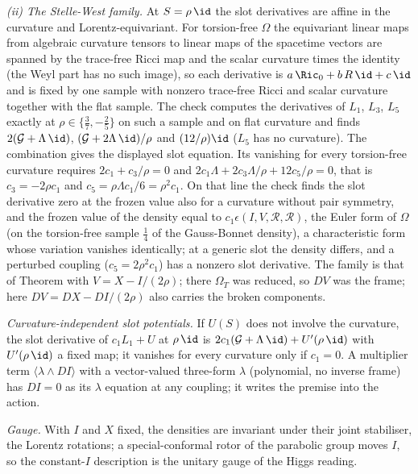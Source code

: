 \emph{(ii) The Stelle-West family.} At $S = \rho\,\id$ the slot derivatives are affine in the curvature and Lorentz-equivariant. For torsion-free $\Omega$ the equivariant linear maps from algebraic curvature tensors to linear maps of the spacetime vectors are spanned by the trace-free Ricci map and the scalar curvature times the identity (the Weyl part has no such image), so each derivative is $a\,\Ric_{0} + b\,R\,\id + c\,\id$ and is fixed by one sample with nonzero trace-free Ricci and scalar curvature together with the flat sample. The check computes the derivatives of $L_{1}$, $L_{3}$, $L_{5}$ exactly at $\rho \in \{\tfrac37, -\tfrac25\}$ on such a sample and on flat curvature and finds $2(\mathcal{G} + \Lambda\,\id)$, $(\mathcal{G} + 2\Lambda\,\id)/\rho$ and $(12/\rho)\id$ ($L_{5}$ has no curvature). The combination gives the displayed slot equation. Its vanishing for every torsion-free curvature requires $2c_{1} + c_{3}/\rho = 0$ and $2c_{1}\Lambda + 2c_{3}\Lambda/\rho + 12c_{5}/\rho = 0$, that is $c_{3} = -2\rho c_{1}$ and $c_{5} = \rho\Lambda c_{1}/6 = \rho^{2}c_{1}$. On that line the check finds the slot derivative zero at the frozen value also for a curvature without pair symmetry, and the frozen value of the density equal to $c_{1}\epsilon(I, V, \mathcal{R}, \mathcal{R})$, the Euler form of $\Omega$ (on the torsion-free sample $\tfrac14$ of the Gauss-Bonnet density), a characteristic form whose variation vanishes identically; at a generic slot the density differs, and a perturbed coupling ($c_{5} = 2\rho^{2}c_{1}$) has a nonzero slot derivative. The family is that of Theorem  with $V = X - I/(2\rho)$; there $\Omega_{T}$ was reduced, so $DV$ was the frame; here $DV = DX - DI/(2\rho)$ also carries the broken components.

\emph{Curvature-independent slot potentials.} If $U(S)$ does not involve the curvature, the slot derivative of $c_{1}L_{1} + U$ at $\rho\,\id$ is $2c_{1}(\mathcal{G} + \Lambda\,\id) + U'(\rho\,\id)$ with $U'(\rho\,\id)$ a fixed map; it vanishes for every curvature only if $c_{1} = 0$. A multiplier term $\langle \lambda \wedge DI\rangle$ with a vector-valued three-form $\lambda$ (polynomial, no inverse frame) has $DI = 0$ as its $\lambda$ equation at any coupling; it writes the premise into the action.

\emph{Gauge.} With $I$ and $X$ fixed, the densities are invariant under their joint stabiliser, the Lorentz rotations; a special-conformal rotor of the parabolic group moves $I$, so the constant-$I$ description is the unitary gauge of the Higgs reading.

